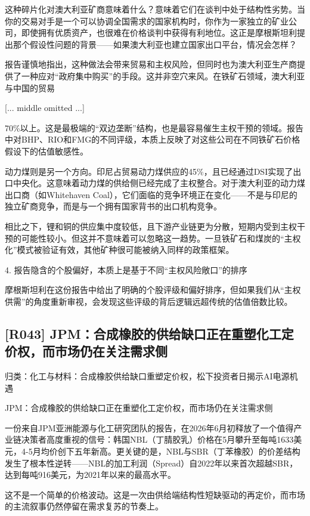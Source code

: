 \documentclass[11pt]{ctexart}
\begin{document}
这种碎片化对澳大利亚矿商意味着什么？意味着它们在谈判中处于结构性劣势。当你的交易对手是一个可以协调全国需求的国家机构时，你作为一家独立的矿业公司，即使拥有优质资产，也很难在价格谈判中获得有利地位。这正是摩根斯坦利提出那个假设性问题的背景——如果澳大利亚也建立国家出口平台，情况会怎样？

报告谨慎地指出，这种做法会带来贸易和主权风险，但同时也为澳大利亚生产商提供了一种应对“政府集中购买”的手段。这并非空穴来风。在铁矿石领域，澳大利亚与中国的贸易

[... middle omitted ...]

70\%以上。这是最极端的“双边垄断”结构，也是最容易催生主权干预的领域。报告中对BHP、RIO和FMG的不同评级，本质上反映了对这些公司在不同铁矿石价格假设下的估值敏感性。

动力煤则是另一个方向。印尼占贸易动力煤供应的45\%，且已经通过DSI实现了出口中央化。这意味着动力煤的供给侧已经完成了主权整合。对于澳大利亚的动力煤出口商（如Whitehaven Coal），它们面临的竞争环境正在变化——不是与印尼的独立矿商竞争，而是与一个拥有国家背书的出口机构竞争。

相比之下，锂和铜的供应集中度较低，且下游产业链更为分散，短期内受到主权干预的可能性较小。但这并不意味着可以忽略这一趋势。一旦铁矿石和煤炭的“主权化”模式被验证有效，其他矿种很可能被纳入同样的政策框架。

4. 报告隐含的个股偏好，本质上是基于不同“主权风险敞口”的排序

摩根斯坦利在这份报告中给出了明确的个股评级和偏好排序，但如果我们从“主权供需”的角度重新审视，会发现这些评级的背后逻辑远超传统的估值倍数比较。

\subsection{[R043] JPM：合成橡胶的供给缺口正在重塑化工定价权，而市场仍在关注需求侧}
{\small\color{refgray}归类：化工与材料：合成橡胶供给缺口重塑定价权，松下投资者日揭示AI电源机遇}

JPM：合成橡胶的供给缺口正在重塑化工定价权，而市场仍在关注需求侧

一份来自JPM亚洲能源与化工研究团队的报告，在2026年6月初释放了一个值得产业链决策者高度重视的信号：韩国NBL（丁腈胶乳）价格在5月攀升至每吨1633美元，4-5月均价创下五年新高。更关键的是，NBL与SBR（丁苯橡胶）的价差结构发生了根本性逆转——NBL的加工利润（Spread）自2022年以来首次超越SBR，达到每吨916美元，为2021年以来的最高水平。

这不是一个简单的价格波动。这是一次由供给端结构性短缺驱动的再定价，而市场的主流叙事仍然停留在需求复苏的节奏上。
\end{document}
